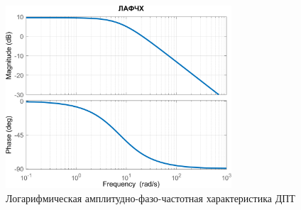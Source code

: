 \begin{figure}[H]
    \centering
    \includegraphics[width=0.75\textwidth, trim={0cm 0cm 0cm 0cm}]{../images/1_5.png}
    \caption{Логарифмическая амплитудно-фазо-частотная характеристика ДПТ}
\end{figure}

\endinput